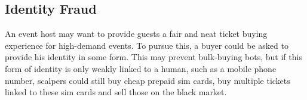 
\subsection{Identity Fraud}\label{subsection:identity-fraud}

An event host may want to provide guests a fair and neat ticket buying experience for high-demand events. To pursue this, a buyer could be asked to provide his identity in some form. This may prevent bulk-buying bots, but if this form of identity is only weakly linked to a human, such as a mobile phone number, scalpers could still buy cheap prepaid sim cards, buy multiple tickets linked to these sim cards and sell those on the black market.
